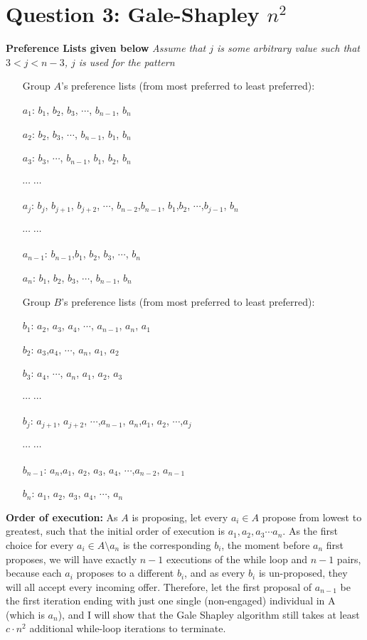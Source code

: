 \documentclass{article}
\begin{document}
\section{Question 3: Gale-Shapley $n^2$}
\textbf{Preference Lists given below} \textit{Assume that $j$ is some arbitrary value such that $3<j<n-3$, $j$ is used for the pattern} \newline 
 \begin{enumerate}
 \item[] Group $A$'s preference lists (from most preferred to least preferred):
 \item[$a_1$:] $b_1$, $b_2$, $b_3$, $\cdots$, $b_{n-1}$, $b_n$
 \item[$a_2$:] $b_2$, $b_3$, $\cdots$, $b_{n-1}$, $b_{1}$, $b_n$
 \item[$a_3$:] $b_3$, $\cdots$, $b_{n-1}$, $b_{1}$, $b_{2}$, $b_n$
 \item [$\cdots$] $\cdots$ 
 \item [$a_j$:] $b_j$, $b_{j+1}$, $b_{j+2}$, $\cdots$, $b_{n-2}$,$b_{n-1}$, $b_{1}$,$b_{2}$, $\cdots$,$b_{j-1}$, $b_n$
 \item [$\cdots$] $\cdots$
  \item[$a_{n-1}$:] $b_{n-1}$,$b_1$, $b_2$, $b_3$, $\cdots$, $b_n$
 \item[$a_n$:] $b_1$, $b_2$, $b_3$, $\cdots$, $b_{n-1}$, $b_n$
 \end{enumerate}
 \begin{enumerate}
 \item[]  Group $B$'s preference lists (from most preferred to least preferred):
 \item[$b_1$:] $a_2$, $a_3$, $a_4$, $\cdots$, $a_{n-1}$, $a_{n}$, $a_1$
 \item[$b_2$:] $a_3$,$a_4$, $\cdots$, $a_{n}$, $a_1$, $a_2$
 \item[$b_3$:] $a_4$, $\cdots$, $a_{n}$, $a_1$, $a_2$, $a_3$
 \item [$\cdots$] $\cdots$ 
 \item [$b_j$:] $a_{j+1}$, $a_{j+2}$, $\cdots$,$a_{n-1}$, $a_{n}$,$a_{1}$, $a_{2}$, $\cdots$,$a_{j}$
 \item [$\cdots$] $\cdots$
 \item[$b_{n-1}$:] $a_{n}$,$a_1$, $a_2$, $a_3$, $a_4$, $\cdots$,$a_{n-2}$, $a_{n-1}$
 \item[$b_n$:] $a_1$, $a_2$, $a_3$, $a_4$, $\cdots$, $a_{n}$
 \end{enumerate}
\textbf{Order of execution:} As $A$ is proposing, let every $a_i \in A$ propose from lowest to greatest, such that the initial order of execution is $a_1,a_2, a_3 \cdots a_n$. As the first choice for every $a_i \in A \setminus a_n$ is the corresponding $b_i$, the moment before $a_n$ first proposes, we will have exactly $n-1$ executions of the while loop and $n-1$ pairs, because each $a_i$ proposes to a different $b_i$, and as every $b_i$ is un-proposed, they will all accept every incoming offer. Therefore, let the first proposal of $a_{n-1}$ be the first iteration ending with just one single (non-engaged) individual in A (which is $a_n$), and I will show that the Gale Shapley algorithm still takes at least $c \cdot n^2$ additional while-loop iterations to terminate. \newline \newline 
\end{document}
